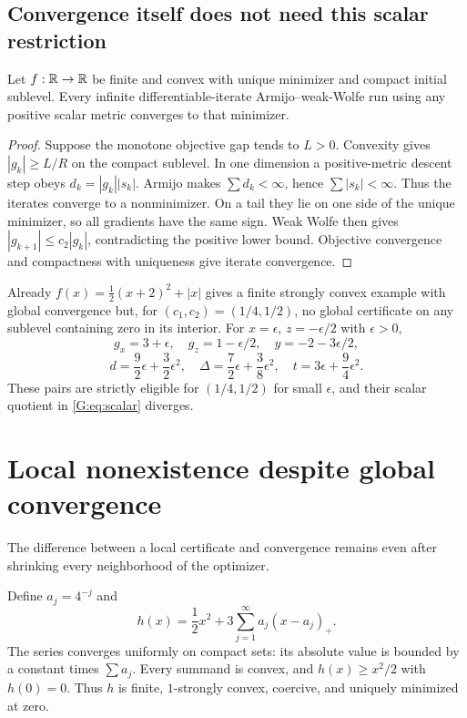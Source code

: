 

\subsection{Convergence itself does not need this scalar restriction}

\begin{proposition}\label{G:prop:scalarconv}
Let $f:\mathbb R\to\mathbb R$ be finite and convex with unique minimizer and compact initial sublevel. Every infinite differentiable-iterate Armijo--weak-Wolfe run using any positive scalar metric converges to that minimizer.
\end{proposition}
\begin{proof}
Suppose the monotone objective gap tends to $L>0$. Convexity gives $|g_k|\ge L/R$ on the compact sublevel. In one dimension a positive-metric descent step obeys $d_k=|g_k||s_k|$. Armijo makes $\sum d_k<\infty$, hence $\sum|s_k|<\infty$. Thus the iterates converge to a nonminimizer. On a tail they lie on one side of the unique minimizer, so all gradients have the same sign. Weak Wolfe then gives $|g_{k+1}|\le c_2|g_k|$, contradicting the positive lower bound. Objective convergence and compactness with uniqueness give iterate convergence.
\end{proof}
Already $f(x)=\frac12(x+2)^2+|x|$ gives a finite strongly convex example with global convergence but, for $(c_1,c_2)=(1/4,1/2)$, no global certificate on any sublevel containing zero in its interior. For $x=\epsilon$, $z=-\epsilon/2$ with $\epsilon>0$,
\[
 g_x=3+\epsilon,\quad g_z=1-\epsilon/2,\quad y=-2-3\epsilon/2,
\]
\[
 d=\frac92\epsilon+\frac32\epsilon^2,\quad
 \Delta=\frac72\epsilon+\frac38\epsilon^2,\quad
 t=3\epsilon+\frac94\epsilon^2.
\]
These pairs are strictly eligible for $(1/4,1/2)$ for small $\epsilon$, and their scalar quotient in \eqref{G:eq:scalar} diverges.


\setcounter{section}{6}
\setcounter{theorem}{0}
\setcounter{equation}{6}


\section{Local nonexistence despite global convergence}
The difference between a local certificate and convergence remains even after shrinking every neighborhood of the optimizer.

Define $a_j=4^{-j}$ and
\begin{equation}
 h(x)=\frac12x^2+3\sum_{j=1}^\infty a_j(x-a_j)_+. \label{G:eq:infinite}
\end{equation}
The series converges uniformly on compact sets: its absolute value is bounded by a constant times $\sum a_j$. Every summand is convex, and $h(x)\ge x^2/2$ with $h(0)=0$. Thus $h$ is finite, $1$-strongly convex, coercive, and uniquely minimized at zero.

